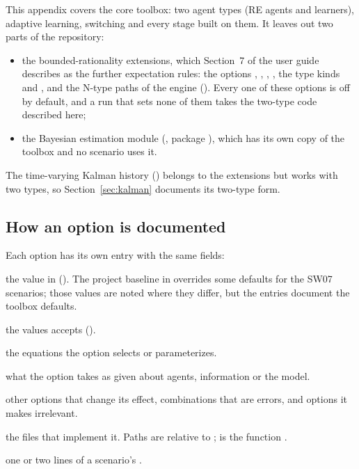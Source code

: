 \documentclass[11pt,a4paper]{article}
\newenvironment{optspec}%
  {\begin{description}[style=sameline,leftmargin=2.7cm,labelwidth=2.5cm,font=\normalfont\itshape]}%
  {\end{description}}
\begin{document}
This appendix covers the core toolbox: two agent types (RE agents and learners), adaptive
learning, switching and every stage built on them. It leaves out two parts of the repository:

\begin{itemize}[nosep]
  \item the bounded-rationality extensions, which Section~7 of the user guide describes as the
        further expectation rules: the options ,
        , , , the type kinds
         and , and the N-type paths of the engine
        (). Every one of these options is off by default, and a run that
        sets none of them takes the two-type code described here;
  \item the Bayesian estimation module (, package ), which has
        its own copy of the toolbox and no scenario uses it.
\end{itemize}

The time-varying Kalman history () belongs to the
extensions but works with two types, so Section~\ref{sec:kalman} documents its two-type form.

\subsection{How an option is documented}

Each option has its own entry with the same fields:

\begin{optspec}
  \item[Default] the value in  (). The project
        baseline in  overrides some defaults for the SW07
        scenarios; those values are noted where they differ, but the entries document the
        toolbox defaults.
  \item[Values] the values  accepts ().
  \item[Math] the equations the option selects or parameterizes.
  \item[Assumptions] what the option takes as given about agents, information or the model.
  \item[Interactions] other options that change its effect, combinations that are errors, and
        options it makes irrelevant.
  \item[Code] the files that implement it. Paths are relative to ;
         is the function .
  \item[Example] one or two lines of a scenario's .
\end{optspec}
\end{document}
